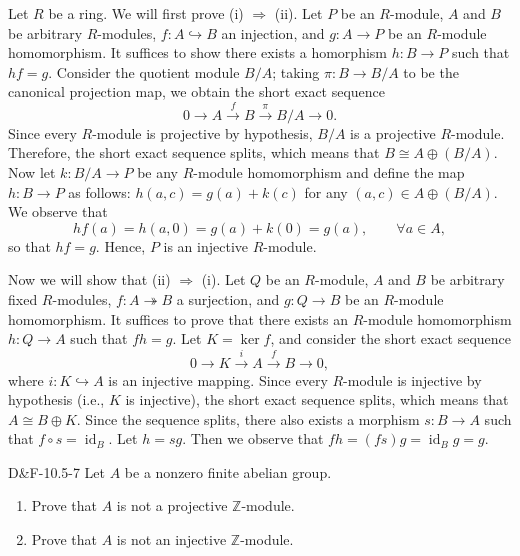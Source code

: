 \documentclass{article}
\newcommand{\embedd}{\hookrightarrow}
\begin{document}
	Let $R$ be a ring. We will first prove (i) $\Rightarrow$ (ii). Let $P$ be an $R$-module, $A$ and $B$ be arbitrary $R$-modules, $f: A \embedd B$ an injection, and $g: A \to P$ be an $R$-module homomorphism. It suffices to show there exists a homorphism $h: B \to P$ such that $hf = g$. Consider the quotient module $B/A$; taking $\pi: B \to B/A$ to be the canonical projection map, we obtain the short exact sequence 
	\begin{equation*}
		0 \to A \xrightarrow{f} B \xrightarrow{\pi} B/A \to 0. 
	\end{equation*}
	Since every $R$-module is projective by hypothesis, $B/A$ is a projective $R$-module. Therefore, the short exact sequence splits, which means that $B \cong A \oplus (B/A)$. Now let $k: B/A \to P$ be any $R$-module homomorphism and define the map $h: B \to P$ as follows: $h(a, c) = g(a) + k(c)$ for any $(a, c) \in A \oplus (B/A)$. We observe that 
	\begin{equation*}
		hf(a) = h(a, 0) = g(a) + k(0) = g(a), \qquad \forall a \in A, 
	\end{equation*}
	so that $hf = g$. Hence, $P$ is an injective $R$-module. 
	
	Now we will show that (ii) $\Rightarrow$ (i). Let $Q$ be an $R$-module, $A$ and $B$ be arbitrary fixed $R$-modules, $f: A \twoheadrightarrow B$ a surjection, and $g: Q \to B$ be an $R$-module homomorphism. It suffices to prove that there exists an $R$-module homomorphism $h: Q \to A$ such that $fh = g$. Let $K = \ker{f}$, and consider the short exact sequence 
	\begin{equation*}
		0 \to K \xrightarrow{i} A \xrightarrow{f} B \to 0, 
	\end{equation*}
	where $i: K \embedd A$ is an injective mapping. Since every $R$-module is injective by hypothesis (i.e., $K$ is injective), the short exact sequence splits, which means that $A \cong B \oplus K$. Since the sequence splits, there also exists a morphism $s: B \to A$ such that $f \circ s = \operatorname{id}_{B}$. Let $h = sg$. Then we observe that $fh = (fs)g = \operatorname{id}_{B}g = g$. 
	
	\begin{prb}{D\&F-10.5-7}
		Let $A$ be a nonzero finite abelian group. \vspace{-0.25cm}
		\begin{enumerate}[itemsep =-2pt,label = \textbf{(\alph{*})}]
			\item Prove that $A$ is not a projective $\mathbb{Z}$-module. 
			\item Prove that $A$ is not an injective $\mathbb{Z}$-module. 
		\end{enumerate}
	\end{prb}
	
\end{document}
